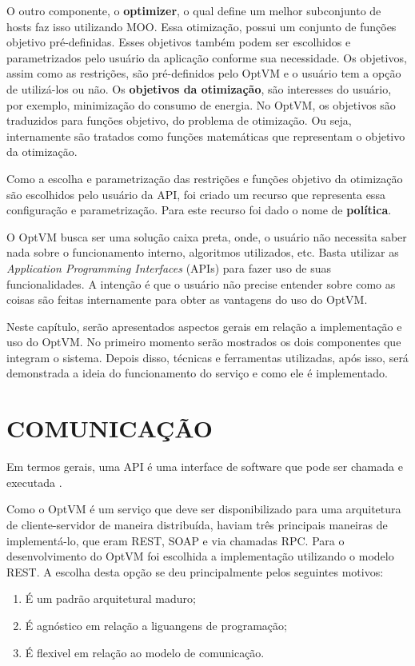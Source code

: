 O outro componente, o \textbf{optimizer}, o qual define um melhor subconjunto de hosts faz 
isso utilizando MOO. Essa otimização, possui um conjunto de funções objetivo pré-definidas. 
Esses objetivos também podem ser escolhidos
e parametrizados pelo usuário da aplicação conforme sua necessidade. Os objetivos,
assim como as restrições, são pré-definidos pelo OptVM e o usuário tem a opção de utilizá-los ou não.
Os \textbf{objetivos da otimização}, são interesses do usuário, por exemplo, minimização do consumo de energia.
No OptVM, os objetivos são traduzidos para funções objetivo, do problema de otimização. Ou seja, internamente são tratados
como funções matemáticas que representam o objetivo da otimização.

Como a escolha e parametrização das restrições e funções objetivo da otimização são escolhidos pelo usuário da API,
foi criado um recurso que representa essa configuração e parametrização. Para este recurso foi dado o nome de \textbf{política}. 

O OptVM busca ser uma solução caixa preta, onde, o usuário não necessita saber nada sobre o funcionamento interno, 
algoritmos utilizados, etc. Basta utilizar as \textit{Application Programming Interfaces} (APIs) para fazer uso de suas funcionalidades.
A intenção é que o usuário não precise entender sobre como as coisas são feitas internamente para obter as vantagens do uso do OptVM.

Neste capítulo, serão apresentados aspectos gerais em relação a implementação e uso do OptVM. 
No primeiro momento serão mostrados os dois componentes que integram o sistema. 
Depois disso, técnicas e ferramentas utilizadas, após isso, será demonstrada a ideia do funcionamento 
do serviço e como ele é implementado.

\section{COMUNICAÇÃO}
Em termos gerais, uma API é uma interface de software que pode ser chamada e executada \cite{eizinger}. 

Como o OptVM é um serviço que deve ser disponibilizado para uma arquitetura de 
cliente-servidor de maneira distribuída, haviam três principais maneiras de implementá-lo, 
que eram REST, SOAP e via chamadas RPC. 
Para o desenvolvimento do OptVM foi escolhida a implementação utilizando o modelo REST. 
A escolha desta opção se deu principalmente pelos seguintes motivos:

\begin{enumerate}
\item É um padrão arquitetural maduro;
\item É agnóstico em relação a liguangens de programação;
\item É flexivel em relação ao modelo de comunicação.
\end{enumerate}

